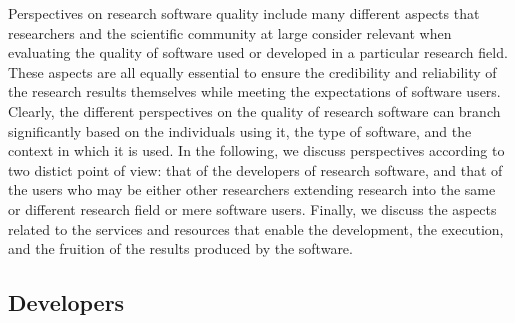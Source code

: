 Perspectives on research software quality include many different aspects that researchers and the scientific community at large consider relevant when evaluating the quality of software used or developed in a particular research field. These aspects are all equally essential to ensure the credibility and reliability of the research results themselves while meeting the expectations of software users. Clearly, the different perspectives on the quality of research software can branch significantly based on the individuals using it, the type of software, and the context in which it is used. 
In the following, we discuss perspectives according to two distict point of view: that of the developers of research software, and that of the users who may be either other researchers extending research into the same or different research field or mere software users. Finally, we discuss the aspects related to the services and resources that enable the development, the execution, and the fruition of the results produced by the software.  

\subsection{Developers}

